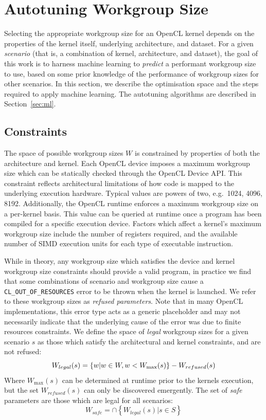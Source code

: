\documentclass[preprint,nonatbib,10pt,nocopyrightspace]{sigplanconf}
\begin{document}
\section{Autotuning Workgroup Size}

Selecting the appropriate workgroup size for an OpenCL kernel depends
on the properties of the kernel itself, underlying architecture, and
dataset. For a given \emph{scenario} (that is, a combination of
kernel, architecture, and dataset), the goal of this work is to
harness machine learning to \emph{predict} a performant workgroup size
to use, based on some prior knowledge of the performance of workgroup
sizes for other scenarios. In this section, we describe the
optimisation space and the steps required to apply machine
learning. The autotuning algorithms are described in
Section~\ref{sec:ml}.

\subsection{Constraints}

The space of possible workgroup sizes $W$ is constrained by properties
of both the architecture and kernel. Each OpenCL device imposes a
maximum workgroup size which can be statically checked through the
OpenCL Device API. This constraint reflects architectural limitations
of how code is mapped to the underlying execution hardware. Typical
values are powers of two, e.g.\ 1024, 4096, 8192. Additionally, the
OpenCL runtime enforces a maximum workgroup size on a per-kernel
basis. This value can be queried at runtime once a program has been
compiled for a specific execution device. Factors which affect a
kernel's maximum workgroup size include the number of registers
required, and the available number of SIMD execution units for each
type of executable instruction.

While in theory, any workgroup size which satisfies the device and
kernel workgroup size constraints should provide a valid program, in
practice we find that some combinations of scenario and workgroup size
cause a \texttt{CL\_OUT\_OF\_RESOURCES} error to be thrown when the
kernel is launched. We refer to these workgroup sizes as \emph{refused
  parameters}. Note that in many OpenCL implementations, this error
type acts as a generic placeholder and may not necessarily indicate
that the underlying cause of the error was due to finite resources
constraints. We define the space of \emph{legal} workgroup sizes for a
given scenario $s$ as those which satisfy the architectural and kernel
constraints, and are not refused:
%
\begin{equation}
  \footnotesize
  W_{legal}(s) = \left\{w | w \in W, w < W_{\max}(s) \right\} - W_{refused}(s)
\end{equation}
%
Where $W_{\max}(s)$ can be determined at runtime prior to the kernels
execution, but the set $W_{refused}(s)$ can only be discovered
emergently. The set of \emph{safe} parameters are those which are
legal for all scenarios:
%
\begin{equation}
  W_{safe} = \cap \left\{ W_{legal}(s) | s \in S \right\}
\end{equation}
\end{document}
